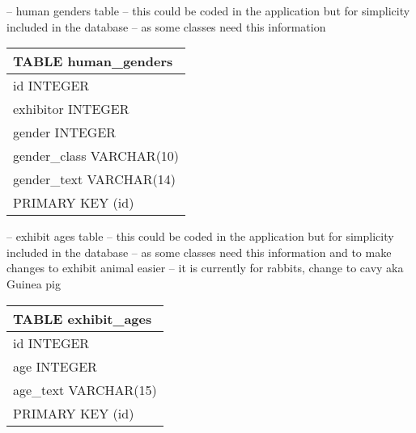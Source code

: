 \documentclass[a4paper,11pt]{report}
\begin{document}
-- human genders table
-- this could be coded in the application but for simplicity included in the database
-- as some classes need this information \newline
\begin{tabular}{|p{15cm}|}  \hline
TABLE human\_genders\\ \hline
id INTEGER\\
exhibitor INTEGER\\
gender INTEGER\\
gender\_class VARCHAR(10)\\
gender\_text VARCHAR(14)\\
PRIMARY KEY (id)\\ \hline
\end{tabular}
-- exhibit ages table 
-- this could be coded in the application but for simplicity included in the database
-- as some classes need this information and to make changes to exhibit animal easier
-- it is currently for rabbits, change to cavy aka Guinea pig \newline
\begin{tabular}{|p{15cm}|}  \hline
TABLE exhibit\_ages \\ \hline
id INTEGER\\
age INTEGER\\
age\_text VARCHAR(15)\\
PRIMARY KEY (id)\\ \hline
\end{tabular}
\end{document}
